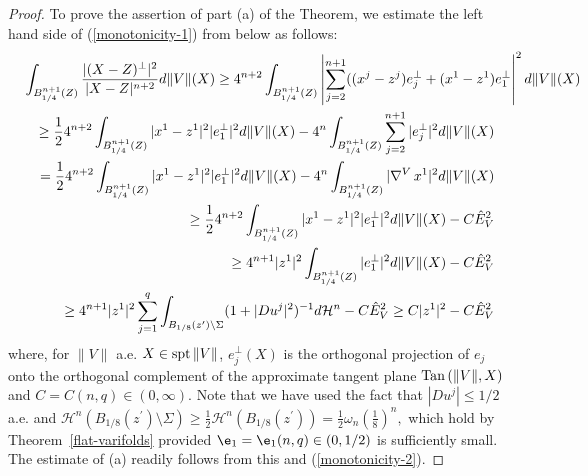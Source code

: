 \documentclass[a4paper,11pt]{amsart}
\begin{document}
\begin{proof}
To prove the assertion of part (a) of the Theorem, we estimate the left hand side of (\ref{monotonicity-1}) from below as follows:
\begin{eqnarray}\label{monotonicity-4}
\int_{B_{1/4}^{n+1}(Z)} \frac{|(X - Z)^{\perp}|^{2}}{|X - Z|^{n+2}} d\|V\|(X) \geq 4^{n+2}\int_{B_{1/4}^{n+1}(Z)} \left|\sum_{j=2}^{n+1}((x^{j} - z^{j})e_{j}^{\perp} + 
(x^{1} - z^{1})e_{1}^{\perp}\right|^{2} d\|V\|(X)\nonumber\\
&&\hspace{-5.5in}\geq \frac{1}{2}4^{n+2}\int_{B_{1/4}^{n+1}(Z)} |x^{1} - z^{1}|^{2}|e_{1}^{\perp}|^{2} d\|V\|(X) - 4^{n}\int_{B_{1/4}^{n+1}(Z)} \sum_{j=2}^{n+1}|e_{j}^{\perp}|^{2} d\|V\|(X)\nonumber\\
&&\hspace{-5.5in}=   \frac{1}{2}4^{n+2}\int_{B_{1/4}^{n+1}(Z)} |x^{1} - z^{1}|^{2}|e_{1}^{\perp}|^{2} d\|V\|(X) - 4^{n} \int_{B_{1/4}^{n+1}(Z)} |\nabla^{V} \, x^{1}|^{2}d\|V\|(X)\nonumber\\
&&\hspace{-5.5in}\geq  \frac{1}{2}4^{n+2}\int_{B_{1/4}^{n+1}(Z)} |x^{1} - z^{1}|^{2}|e_{1}^{\perp}|^{2}d\|V\|(X) - C{\hat E}_{V}^{2}\nonumber\\
&&\hspace{-5.5in}\geq4^{n+1}|z^{1}|^{2}\int_{B_{1/4}^{n+1}(Z)}|e_{1}^{\perp}|^{2}d\|V\|(X) - C{\hat E}_{V}^{2}\nonumber\\
&&\hspace{-5.5in}\geq 4^{n+1}|z^{1}|^{2}\sum_{j=1}^{q}\int_{B_{1/8}(z^{\prime}) \setminus \Sigma}(1 + |Du^{j}|^{2})^{-1}d{\mathcal H}^{n} - C{\hat E}_{V}^{2} \geq C|z^{1}|^{2}  - C{\hat E}_{V}^{2}
\end{eqnarray}
where, for $\|V\|$ a.e. $X \in {\rm spt} \, \|V\|$, $e_{j}^{\perp}(X)$ is the orthogonal projection of $e_{j}$ onto the orthogonal complement of the approximate tangent plane ${\rm Tan} \, (\|V\|, X)$ and $C = C(n, q) \in (0, \infty).$ Note that we have used the fact that $|Du^{j}| \leq 1/2$ a.e. and 
${\mathcal H}^{n}(B_{1/8}(z^{\prime}) \setminus \Sigma) \geq \frac{1}{2}{\mathcal H}^{n}(B_{1/8}(z^{\prime})) = 
\frac{1}{2}\omega_{n}(\frac{1}{8})^{n},$ which hold by Theorem~\ref{flat-varifolds} provided $\e_{1} = \e_{1}(n, q) \in (0, 1/2)$ is sufficiently small. The estimate of (a) readily follows from this and (\ref{monotonicity-2}).


\end{proof}
\end{document}

